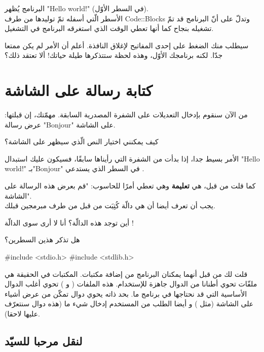 البرنامج يُظهر
"\textenglish{Hello world!}"
 (في السطر الأوّل).\\
الأسطر الّتي أسفله تمّ توليدها من طرف
\textenglish{Code::Blocks}
 وتدلّ على أنّ البرنامج قد تمّ تشغيله بنجاح كما أنها تعطي الوقت الذي استغرقه البرنامج في التشغيل.

 سيطلب منك الضغط على إحدى المفاتيح لإغلاق النافذة. أعلم أن الأمر لم يكن ممتعا جدّا. لكنه برنامجك الأوّل، وهذه لحظة ستتذكرها طيلة حياتك! ألا تعتقد ذلك؟

\section{كتابة رسالة على الشاشة}

من الآن سنقوم بإدخال التعديلات على الشفرة المصدرية السابقة. مهمّتك، إن قبلتها: عرض رسالة
"\textenglish{Bonjour}"
 على الشاشة.

\begin{question}
  كيف يمكنني اختيار النص الّذي سيظهر على الشاشة؟
\end{question}

الأمر بسيط جدا، إذا بدأت من الشفرة التي رأيناها سابقًا، فسيكون عليك استبدال
"\textenglish{Hello world!}"
 بـ"\textenglish{Bonjour}"
 في السطر الذي يستدعي
.

كما قلت من قبل،
 هي
\textbf{تعليمة}
 وهي تعطي أمرًا للحاسوب: "قم بعرض هذه الرسالة على الشاشة".\\
يجب أن تعرف أيضا أن
 هي دالّة كُتِبَت من قبل من طرف مبرمجين قبلك.

\begin{question}
   أين توجد هذه الدالّة؟ أنا لا أرى سوى الدالّة !
\end{question}

هل تذكر هذين السطرين؟

\begin{Csource}
#include <stdio.h>
#include <stdlib.h>
\end{Csource}

قلت لك من قبل أنهما يمكنان البرنامج من إضافة مكتبات. المكتبات في الحقيقة هي ملفّات تحوي أطنانا من الدوال جاهزة للإستخدام. هذه الملفات
( و )
 تحوي أغلب الدوال الأساسية التي قد نحتاجها في برنامج ما.
 بحد ذاته يحوي دوال تمكّن من عرض أشياء على الشاشة (مثل
 )
 و أيضا الطلب من المستخدم إدخال شيء ما (هذه دوال سنتعرّف عليها لاحقا).

\subsection{لنقل مرحبا للسيّد}

